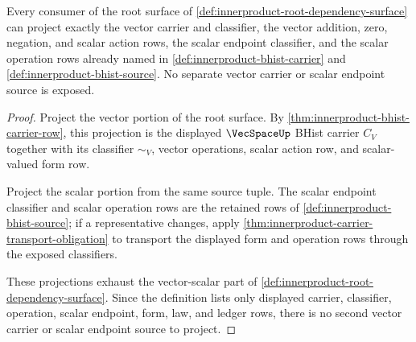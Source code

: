 \begin{theorem}
\label{thm:innerproduct-root-vecspace-scalar-exposure}
Every consumer of the root surface of
\autoref{def:innerproduct-root-dependency-surface} can project exactly the
vector carrier and classifier, the vector addition, zero, negation, and scalar
action rows, the scalar endpoint classifier, and the scalar operation rows
already named in \autoref{def:innerproduct-bhist-carrier} and
\autoref{def:innerproduct-bhist-source}. No separate vector carrier or scalar
endpoint source is exposed.
\end{theorem}
\begin{proof}
Project the vector portion of the root surface. By
\autoref{thm:innerproduct-bhist-carrier-row}, this projection is the displayed
$\VecSpaceUp$ BHist carrier $C_V$ together with its classifier $\sim_V$, vector
operations, scalar action row, and scalar-valued form row.

Project the scalar portion from the same source tuple. The scalar endpoint
classifier and scalar operation rows are the retained rows of
\autoref{def:innerproduct-bhist-source}; if a representative changes, apply
\autoref{thm:innerproduct-carrier-transport-obligation} to transport the
displayed form and operation rows through the exposed classifiers.

These projections exhaust the vector-scalar part of
\autoref{def:innerproduct-root-dependency-surface}. Since the definition lists
only displayed carrier, classifier, operation, scalar endpoint, form, law, and
ledger rows, there is no second vector carrier or scalar endpoint source to
project.
\end{proof}

